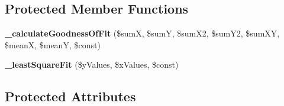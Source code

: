 \subsection*{Protected Member Functions}
\begin{DoxyCompactItemize}
\item 
{\bfseries \+\_\+calculate\+Goodness\+Of\+Fit} (\$sum\+X, \$sum\+Y, \$sum\+X2, \$sum\+Y2, \$sum\+X\+Y, \$mean\+X, \$mean\+Y, \$const)\label{class_p_h_p_excel___best___fit_ae210a080c0d5a2363681268053eb503d}

\item 
{\bfseries \+\_\+least\+Square\+Fit} (\$y\+Values, \$x\+Values, \$const)\label{class_p_h_p_excel___best___fit_aff26999bb1482d9f5df65dfe29696035}

\end{DoxyCompactItemize}
\subsection*{Protected Attributes}
